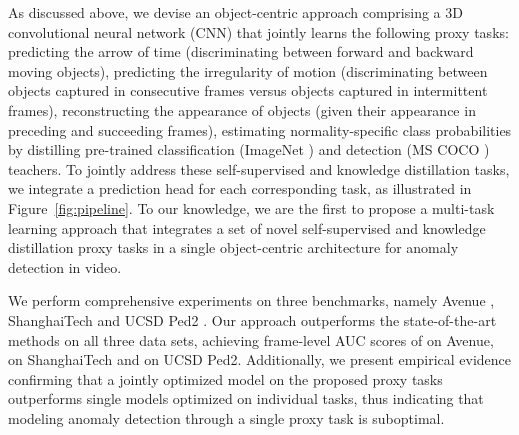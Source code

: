 \documentclass[final]{cvpr}
\begin{document}
As discussed above, we devise an object-centric approach comprising a 3D convolutional neural network (CNN) that jointly learns the following proxy tasks:  predicting the arrow of time (discriminating between forward and backward moving objects),  predicting the irregularity of motion (discriminating between objects captured in consecutive frames versus objects captured in intermittent frames),  reconstructing the appearance of objects (given their appearance in preceding and succeeding frames),  estimating normality-specific class probabilities by distilling pre-trained classification (ImageNet \cite{Russakovsky2015}) and detection (MS COCO \cite{Lin-ECCV-2014}) teachers. 
To jointly address these self-supervised and knowledge distillation tasks, we integrate a prediction head for each corresponding task, as illustrated in Figure~\ref{fig:pipeline}. To our knowledge, we are the first to propose a multi-task learning approach that integrates a set of novel self-supervised and knowledge distillation proxy tasks in a single object-centric architecture for anomaly detection in video.

We perform comprehensive experiments on three benchmarks, namely  Avenue \cite{Lu-ICCV-2013}, ShanghaiTech \cite{Luo-ICCV-2017} and UCSD Ped2 \cite{Mahadevan-CVPR-2010}. Our approach outperforms the state-of-the-art methods \cite{Giorno-ECCV-2016,Dong-Access-2020,Doshi-CVPRW-2020a,Doshi-CVPRW-2020b,Gong-ICCV-2019,Hasan-CVPR-2016,Hinami-ICCV-2017,Ionescu-CVPR-2019,Ionescu-ICCV-2017,Ionescu-WACV-2019,Ji-IJCNN-2020,Kim-CVPR-2009,Lee-ICASSP-2018,Lee-TIP-2019,Liu-CVPR-2018,Liu-BMVC-2018,Lu-ICCV-2013,Lu-ECCV-2020,Luo-ICCV-2017,Mahadevan-CVPR-2010,Mehran-CVPR-2009,Nguyen-ICCV-2019,Park-CVPR-2020,Ramachandra-WACV-2020a,Ramachandra-WACV-2020b,Ravanbakhsh-WACV-2018,Ravanbakhsh-ICIP-2017,Smeureanu-ICIAP-2017,Sultani-CVPR-2018,Sun-ACMMM-2020,Tang-PRL-2020,Vu-AAAI-2019,Wang-ACMMM-2020,Wu-TNNLS-2019,Xu-BMVC-2015,Xu-CVIU-2017,Yu-ACMMM-2020,Zaheer-CVPR-2020,Zhang-PR-2016} on all three data sets, achieving frame-level AUC scores of  on Avenue,  on ShanghaiTech and  on UCSD Ped2. 
Additionally, we present empirical evidence confirming that a jointly optimized model on the proposed proxy tasks outperforms single models optimized on individual tasks, thus indicating that modeling anomaly detection through a single proxy task is suboptimal.
\end{document}

